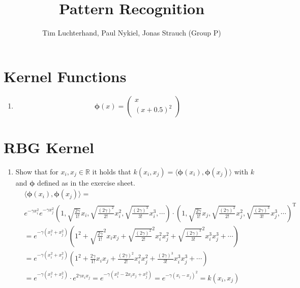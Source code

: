 \documentclass[DIN, pagenumber=false, fontsize=11pt, parskip=half]{scrartcl}
\title{Pattern Recognition}
\author{Tim Luchterhand, Paul Nykiel, Jonas Strauch (Group P)}
\newcommand{\R}[0]{\mathbb{R}}
\begin{document}
    \maketitle
    \section{Kernel Functions}
    \begin{enumerate}
        \item 
            \begin{equation*}
                \bm{\phi}(x) = \begin{pmatrix} x \\ {(x + 0.5)}^2 \end{pmatrix}
            \end{equation*}
    \end{enumerate}
    \section{RBG Kernel}
    \begin{enumerate}
        \item
        Show that for $x_i, x_j \in \R$ it holds that $k(x_i, x_j) = \langle \bm{\phi}(x_i), \bm{\phi}(x_j) \rangle$
        with $k$ and $\bm{\phi}$ defined as in the exercise sheet.
        \begin{align*}
             &\langle \bm{\phi}(x_i), \bm{\phi}(x_j) \rangle = \\
             &e^{-\gamma x_i^2} e^{-\gamma x_j^2}
             \left( 1, \sqrt{\frac{2 \gamma}{1!}} x_i, \sqrt{\frac{(2 \gamma)^2}{2!}} x_i^2,
             \sqrt{\frac{(2 \gamma)^3}{3!}} x_i^3, \cdots \right) \cdot
             \left( 1, \sqrt{\frac{2 \gamma}{1!}} x_j, \sqrt{\frac{(2 \gamma)^2}{2!}} x_j^2,
             \sqrt{\frac{(2 \gamma)^3}{3!}} x_j^3, \cdots \right)^\text{T} \\
             &= e^{-\gamma (x_i^2 + x_j^2)} \left( 1^2 + \sqrt{\frac{2 \gamma}{1!}}^2 x_i x_j
             + \sqrt{\frac{(2 \gamma)^2}{2!}}^2 x_i^2 x_j^2 + \sqrt{\frac{(2 \gamma)^3}{3!}}^2
             x_i^3 x_j^3 + \cdots \right) \\
             &= e^{-\gamma (x_i^2 +  x_j^2)} \left( 1^2 + \frac{2 \gamma}{1!} x_i x_j
             + \frac{(2 \gamma)^2}{2!} x_i^2 x_j^2 + \frac{(2 \gamma)^3}{3!} x_i^3 x_j^3
             + \cdots \right) \\
             &= e^{-\gamma (x_i^2 +  x_j^2)} \cdot e^{2 \gamma x_i x_j}
             = e^{-\gamma (x_i^2 - 2 x_i x_j + x_j^2)} = e^{-\gamma (x_i - x_j)^2} = k(x_i, x_j)
        \end{align*}
    \end{enumerate}
\end{document}
